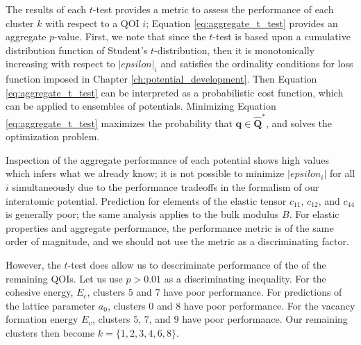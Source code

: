 The results of each $t$-test provides a metric to assess the performance of each cluster $k$ with respect to a QOI $i$; Equation \ref{eq:aggregate_t_test} provides an aggregate $p$-value.  First, we note that since the $t$-test is based upon a cumulative distribution function of Student's $t$-distribution, then it is monotonically increasing with respect to $|epsilon|_i$ and satisfies the ordinality conditions for loss function imposed in Chapter \ref{ch:potential_development}.  Then Equation \ref{eq:aggregate_t_test} can be interpreted as a probabilistic cost function, which can be applied to ensembles of potentials.
Minimizing Equation \ref{eq:aggregate_t_test} maximizes the probability that $\bm{q} \in \hat{\bm{Q}}^*$, and solves the optimization problem.

Inspection of the aggregate performance of each potential shows high values which infers what we already know; it is not possible to minimize $|epsilon_i|$ for all $i$ simultaneously due to the performance tradeoffs in the formalism of our interatomic potential.  Prediction for elements of the elastic tensor $c_{11}$, $c_{12}$, and $c_{44}$ is generally poor; the same analysis applies to the bulk modulus $B$.  For elastic properties and aggregate performance, the performance metric is of the same order of magnitude, and we should not use the metric as a discriminating factor.

  However, the $t$-test does allow us to descriminate performance of the of the remaining QOIs.  Let us use $p > 0.01$ as a discriminating inequality.  For the cohesive energy, $E_c$, clusters $5$ and $7$ have poor performance.  For predictions of the lattice parameter $a_0$, clusters $0$ and $8$ have poor performance.  For the vacancy formation energy $E_v$, clusters $5$, $7$, and $9$ have poor performance.  Our remaining clusters then become $k = \{1,2,3,4,6,8\}$.
